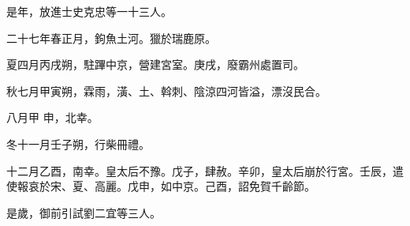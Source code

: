 \begin{pinyinscope}
 是年，放進士史克忠等一十三人。



 二十七年春正月，鉤魚土河。獵於瑞鹿原。



 夏四月丙戌朔，駐蹕中京，營建宮室。庚戌，廢霸州處置司。



 秋七月甲寅朔，霖雨，潢、土、斡刺、陰涼四河皆溢，漂沒民合。



 八月甲
 申，北幸。



 冬十一月壬子朔，行柴冊禮。



 十二月乙酉，南幸。皇太后不豫。戊子，肆赦。辛卯，皇太后崩於行宮。壬辰，遣使報哀於宋、夏、高麗。戊申，如中京。己酉，詔免賀千齡節。



 是歲，御前引試劉二宜等三人。



\end{pinyinscope}